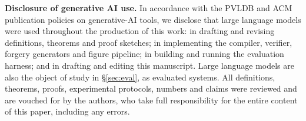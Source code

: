 \smallskip\noindent{}\textbf{Disclosure of generative AI use.} In accordance with
the PVLDB and ACM publication policies on generative-AI tools, we disclose that
large language models were used throughout the production of this work: in
drafting and revising definitions, theorems and proof sketches; in
implementing the compiler, verifier, forgery generators and figure pipeline;
in building and running the evaluation harness; and in drafting and editing
this manuscript. Large language models are also the
object of study in \S\ref{sec:eval}, as evaluated systems. All definitions, theorems, proofs, experimental protocols, numbers and
claims were reviewed and are vouched for by the authors, who take full
responsibility for the entire content of this paper, including any errors.

